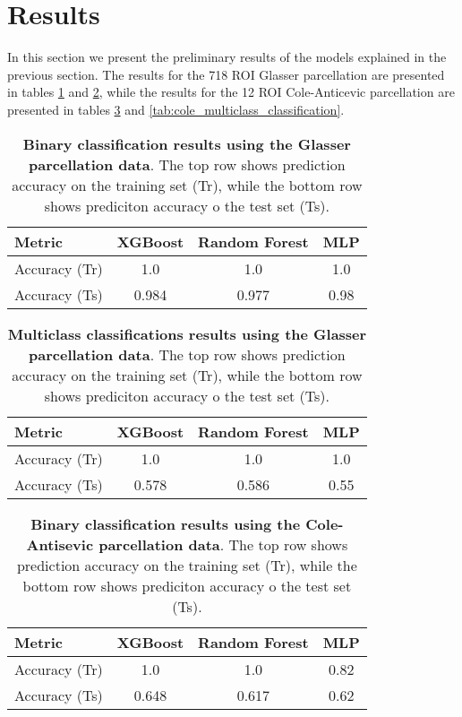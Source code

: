 \documentclass[fleqn,moreauthors,10pt]{ds_report}
\begin{document}
\section*{Results} \label{results}

In this section we present the preliminary results of the models explained in the previous section. The results for the 718 ROI Glasser parcellation are presented in tables \ref{tab:glassier_binary_classification} and \ref{tab:glasser_multiclass_classification}, while the results for the 12 ROI Cole-Anticevic parcellation are presented in tables \ref{tab:cole_binary_classification} and \ref{tab:cole_multiclass_classification}.



\begin{table}[h!]
\centering
\begin{tabular}{|l|c|c|c|}
\hline
\textbf{Metric} & \textbf{XGBoost} & \textbf{Random Forest}& \textbf{MLP} \\ \hline
Accuracy (Tr) & 1.0 & 1.0 & 1.0 \\ \hline
Accuracy (Ts) & 0.984 & 0.977 & 0.98 \\ \hline
\end{tabular}
\caption{\textbf{Binary classification results using the Glasser parcellation data}. The top row shows prediction accuracy on the training set (Tr), while the bottom row shows prediciton accuracy o the test set (Ts).}
\label{tab:glassier_binary_classification}
\end{table}

\begin{table}[h!]
\centering
\begin{tabular}{|l|c|c|c|}
\hline
\textbf{Metric} & \textbf{XGBoost} & \textbf{Random Forest} & \textbf{MLP} \\ \hline
Accuracy (Tr) & 1.0 & 1.0 & 1.0 \\ \hline
Accuracy (Ts) & 0.578 & 0.586 & 0.55 \\ \hline
\end{tabular}
\caption{\textbf{Multiclass classifications results using the Glasser parcellation data}. The top row shows prediction accuracy on the training set (Tr), while the bottom row shows prediciton accuracy o the test set (Ts).}
\label{tab:glasser_multiclass_classification}
\end{table}

\begin{table}[h!]
\centering
\begin{tabular}{|l|c|c|c|}
\hline
\textbf{Metric} & \textbf{XGBoost} & \textbf{Random Forest}& \textbf{MLP} \\ \hline
Accuracy (Tr) & 1.0 & 1.0 & 0.82 \\ \hline
Accuracy (Ts) & 0.648 & 0.617 & 0.62 \\ \hline
\end{tabular}
\caption{\textbf{Binary classification results using the Cole-Antisevic parcellation data}. The top row shows prediction accuracy on the training set (Tr), while the bottom row shows prediciton accuracy o the test set (Ts).}
\label{tab:cole_binary_classification}
\end{table}
\end{document}
